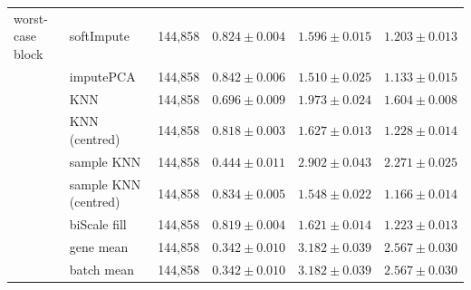 \begin{tabular}{@{}llrccc@{}}
\addlinespace
worst-case block & softImpute & 144{,}858 & $0.824 \pm 0.004$ & $1.596 \pm 0.015$ & $1.203 \pm 0.013$ \\
 & imputePCA & 144{,}858 & $0.842 \pm 0.006$ & $1.510 \pm 0.025$ & $1.133 \pm 0.015$ \\
 & KNN & 144{,}858 & $0.696 \pm 0.009$ & $1.973 \pm 0.024$ & $1.604 \pm 0.008$ \\
 & KNN (centred) & 144{,}858 & $0.818 \pm 0.003$ & $1.627 \pm 0.013$ & $1.228 \pm 0.014$ \\
 & sample KNN & 144{,}858 & $0.444 \pm 0.011$ & $2.902 \pm 0.043$ & $2.271 \pm 0.025$ \\
 & sample KNN (centred) & 144{,}858 & $0.834 \pm 0.005$ & $1.548 \pm 0.022$ & $1.166 \pm 0.014$ \\
 & biScale fill & 144{,}858 & $0.819 \pm 0.004$ & $1.621 \pm 0.014$ & $1.223 \pm 0.013$ \\
 & gene mean & 144{,}858 & $0.342 \pm 0.010$ & $3.182 \pm 0.039$ & $2.567 \pm 0.030$ \\
 & batch mean & 144{,}858 & $0.342 \pm 0.010$ & $3.182 \pm 0.039$ & $2.567 \pm 0.030$ \\
\bottomrule
\end{tabular}
